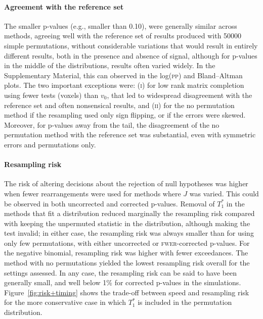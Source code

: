 \paragraph{Agreement with the reference set} The smaller p-values (e.g., smaller than 0.10), were generally similar across methods, agreeing well with the reference set of results produced with 50000 simple permutations, without considerable variations that would result in entirely different results, both in the presence and absence of signal, although for p-values in the middle of the distributions, results often varied widely. In the Supplementary Material, this can observed in the log(\textsc{pp}) and Bland--Altman plots. The two important exceptions were: (\textsc{i}) for low rank matrix completion using fewer tests (voxels) than $v_0$, that led to widespread disagreement with the reference set and often nonsensical results, and (\textsc{ii}) for the no permutation method if the resampling used only sign flipping, or if the errors were skewed. Moreover, for p-values away from the tail, the disagreement of the no permutation method with the reference set was substantial, even with symmetric errors and permutations only.

\paragraph{Resampling risk} The risk of altering decisions about the rejection of null hypotheses was higher when fewer rearrangements were used for methods where $J$ was varied. This could be observed in both uncorrected and corrected p-values. Removal of $T^*_1$ in the methods that fit a distribution reduced marginally the resampling risk compared with keeping the unpermuted statistic in the distribution, although making the test invalid; in either case, the resampling risk was always smaller than for using only few permutations, with either uncorrected or \textsc{fwer}-corrected p-values. For the negative binomial, resampling risk was higher with fewer exceedances. The method with no permutations yielded the lowest resampling risk overall for the settings assessed. In any case, the resampling risk can be said to have been generally small, and well below 1\% for corrected p-values in the simulations. Figure~\ref{fig:risk+timing} shows the trade-off between speed and resampling risk for the more conservative case in which $T^*_1$ is included in the permutation distribution.

